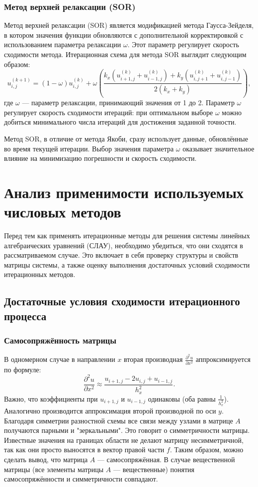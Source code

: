 \documentclass[a4paper, fleqn]{report}
\begin{document}
\subsection*{Метод верхней релаксации (SOR)}
Метод верхней релаксации (SOR) является модификацией метода Гаусса-Зейделя, в котором значения функции обновляются с дополнительной корректировкой с использованием параметра релаксации \( \omega \). Этот параметр регулирует скорость сходимости метода. Итерационная схема для метода SOR выглядит следующим образом:
\[
u_{i,j}^{(k+1)} = (1 - \omega) u_{i,j}^{(k)} + \omega \left( \frac{k_x (u_{i+1,j}^{(k)} + u_{i-1,j}^{(k)}) + k_y (u_{i,j+1}^{(k)} + u_{i,j-1}^{(k)})}{2(k_x + k_y)} \right),
\]
где \( \omega \) — параметр релаксации, принимающий значения от 1 до 2. Параметр \( \omega \) регулирует скорость сходимости итераций: при оптимальном выборе \( \omega \) можно добиться минимального числа итераций для достижения заданной точности.

Метод SOR, в отличие от метода Якоби, сразу использует данные, обновлённые во время текущей итерации. Выбор значения параметра \( \omega \) оказывает значительное влияние на минимизацию погрешности и скорость сходимости.


\chapter{Анализ применимости используемых числовых методов}

Перед тем как применять итерационные методы для решения системы линейных алгебраических уравнений (СЛАУ), необходимо убедиться, что они сходятся в рассматриваемом случае. Это включает в себя проверку структуры и свойств матрицы системы, а также оценку выполнения достаточных условий сходимости итерационных методов.

\section*{Достаточные условия сходимости итерационного процесса}

\subsection*{Самосопряжённость матрицы}
В одномерном случае в направлении $x$ вторая производная $\frac{\partial^2 u}{\partial x^2}$ аппроксимируется по формуле:
\[
\frac{\partial^2 u}{\partial x^2} \approx \frac{u_{i+1,j} - 2u_{i,j} + u_{i-1,j}}{h_x^2}.
\]
Важно, что коэффициенты при $u_{i+1,j}$ и $u_{i-1,j}$ одинаковы (оба равны $\frac{1}{h_x^2}$).  
Аналогично производится аппроксимация второй производной по оси $y$.
Благодаря симметрии разностной схемы все связи между узлами в матрице $A$ получаются парными и "зеркальными". Это говорит о симметричности матрицы. Известные значения на границах области не делают матрицу несимметричной, так как они просто выносятся в вектор правой части $f$. Таким образом, можно сделать вывод, что матрица $A$ — самосопряжённая. В случае вещественной матрицы (все элементы матрицы $A$ — вещественные) понятия самосопряжённости и симметричности совпадают.
\end{document}
